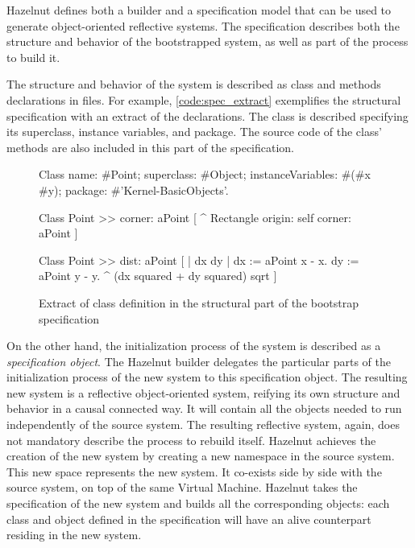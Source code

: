 Hazelnut defines both a builder and a specification model that can be used to generate object-oriented reflective systems.
The specification describes both the structure and behavior of the bootstrapped system, as well as part of the process to build it.

The structure and behavior of the system is described as class and methods declarations in files. For example, \autoref{code:spec_extract} exemplifies the structural specification with an extract of the  declarations. The  class is described specifying its superclass, instance variables, and package. The source code of the class' methods are also included in this part of the specification.

\begin{figure}[!ht]
				\begin{code}
				 Class
				    name: #Point;
				    superclass: #Object;
				    instanceVariables: #(#x #y);
				    package: #'Kernel-BasicObjects'.

				 Class Point >> corner: aPoint
				   [
				   ^ Rectangle origin: self corner: aPoint
				   ]
				   
				 Class Point >> dist: aPoint
				   [
				    | dx dy |
				    dx := aPoint x - x.
				    dy := aPoint y - y.
				    ^ (dx squared + dy squared) sqrt
				   ]
				\end{code}

\caption{Extract of  class definition in the structural part of the bootstrap specification \label{code:spec_extract}}
\end{figure}

On the other hand, the initialization process of the system is described as a \emph{specification object}. The Hazelnut builder delegates the particular parts of the initialization process of the new system to this specification object. 
The resulting new system is a reflective object-oriented system, reifying its own structure and behavior in a causal connected way. It will contain all the objects needed to run independently of the source system. The resulting reflective system, again, does not mandatory describe the process to rebuild itself.
Hazelnut achieves the creation of the new system by creating a new namespace in the source system.
This new space represents the new system.
It co-exists side by side with the source system, on top of the same Virtual Machine.
Hazelnut takes the specification of the new system and builds all the corresponding objects:
each class and object defined in the specification will have an alive counterpart residing in the new system.

